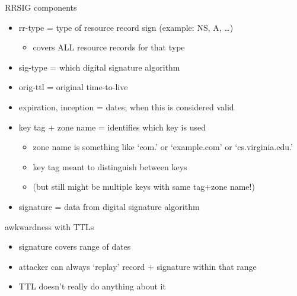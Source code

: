 \begin{frame}{RRSIG components}
\begin{itemize}
\item rr-type = type of resource record sign (example: NS, A, \ldots)
    \begin{itemize}
    \item covers ALL resource records for that type
    \end{itemize}
\item sig-type = which digital signature algorithm
\item orig-ttl = original time-to-live
\item expiration, inception = dates; when this is considered valid
\item key tag + zone name = identifies which key is used
    \begin{itemize}
    \item zone name is something like `com.' or `example.com' or `cs.virginia.edu.'
    \item key tag meant to distinguish between keys
    \item (but still might be multiple keys with same tag+zone name!)
    \end{itemize}
\item signature = data from digital signature algorithm
\end{itemize}
\end{frame}

\begin{frame}{awkwardness with TTLs}
    \begin{itemize}
    \item signature covers range of dates
    \vspace{.5cm}
    \item attacker can always `replay' record + signature within that range
    \item TTL doesn't really do anything about it
    \end{itemize}
\end{frame}

